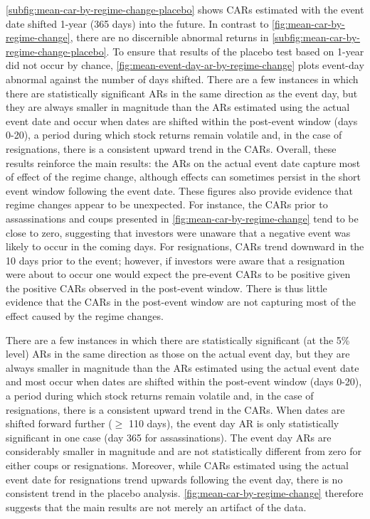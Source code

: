 \documentclass[12pt,final,fleqn]{article}
\theoremstyle{plain}
\begin{document}
\autoref{subfig:mean-car-by-regime-change-placebo} shows CARs estimated with the event date shifted 1-year (365 days) into the future. In contrast to \autoref{fig:mean-car-by-regime-change}, there are no discernible abnormal returns in \autoref{subfig:mean-car-by-regime-change-placebo}. To ensure that results of the placebo test based on 1-year did not occur by chance, \autoref{fig:mean-event-day-ar-by-regime-change} plots event-day abnormal against the number of days shifted. There are a few instances in which there are statistically significant ARs in the same direction as the event day, but they are always smaller in magnitude than the ARs estimated using the actual event date and occur when dates are shifted within the post-event window (days 0-20), a period during which stock returns remain volatile and, in the case of resignations, there is a consistent upward trend in the CARs.  Overall, these results reinforce the main results: the ARs on the actual event date capture most of effect of the regime change, although effects can sometimes persist in the short event window following the event date. These figures also provide evidence that regime changes appear to be unexpected. For instance, the CARs prior to assassinations and coups presented in \autoref{fig:mean-car-by-regime-change} tend to be close to zero, suggesting that investors were unaware that a negative event was likely to occur in the coming days. For resignations, CARs trend downward in the 10 days prior to the event; however, if investors were aware that a resignation were about to occur one would expect the pre-event CARs to be positive given the positive CARs observed in the post-event window. There is thus little evidence that the CARs in the post-event window are not capturing most of the effect caused by the regime changes.

There are a few instances in which there are statistically significant (at the 5\% level) ARs in the same direction as those on the actual event day, but they are always smaller in magnitude than the ARs estimated using the actual event date and most occur when dates are shifted within the post-event window (days 0-20), a period during which stock returns remain volatile and, in the case of resignations, there is a consistent upward trend in the CARs. When dates are shifted forward further ($\geq$ 110 days), the event day AR is only statistically significant in one case (day 365 for assassinations). The event day ARs are considerably smaller in magnitude and are not statistically different from zero for either coups or resignations. Moreover, while CARs estimated using the actual event date for resignations trend upwards following the event day, there is no consistent trend in the placebo analysis. \autoref{fig:mean-car-by-regime-change} therefore suggests that the main results are not merely an artifact of the data.  
\end{document}
